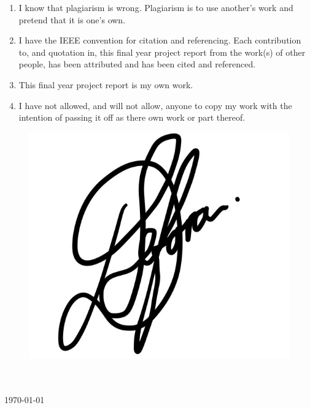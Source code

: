 {}

    \begin{enumerate}
        \item I know that plagiarism is wrong. Plagiarism is to use another's work and pretend that it is one's own.
        \item I have the IEEE convention for citation and referencing. Each contribution to, and quotation in, this final year project report from the work(s) of other people, has been attributed and has been cited and referenced.
        \item This final year project report is my own work.
        \item I have not allowed, and will not allow, anyone to copy my work with the intention of passing it off as there own work or part thereof.
    \end{enumerate}

    \vspace{15mm}
    \begin{figure}[h]
        \hspace{10cm}\includegraphics[width=0.2\linewidth]{2_Preface/DS-signature.jpg}
    \end{figure}
    \mbox{}\hfill\begin{minipage}{65mm} %
      \dotfill\\[1ex]%
      \Author\\
      \today
    \end{minipage}
    
    \vfill\vfill\vfill

